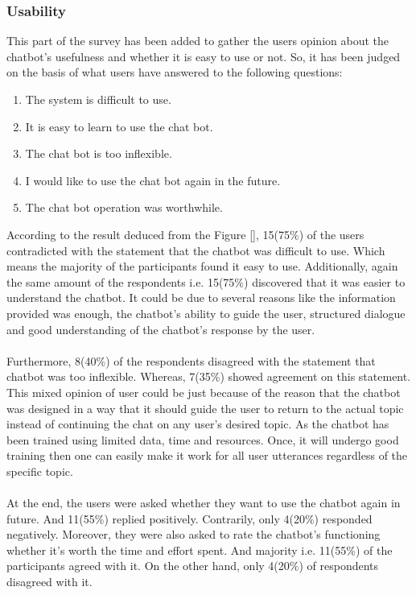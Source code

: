 \subsubsection*{Usability}
This part of the survey has been added to gather the users opinion about the chatbot's usefulness and whether it is easy to use or not. So, it has been judged on the basis of what users have answered to the following questions:
\begin{enumerate}
    \item The system is difficult to use.
    \item It is easy to learn to use the chat bot.
    \item The chat bot is too inflexible.
    \item I would like to use the chat bot again in the future.
    \item The chat bot operation was worthwhile.
\end{enumerate}
According to the result deduced from the Figure \ref{}, 15(75\%) of the users contradicted with the statement that the chatbot was difficult to use. Which means the majority of the participants found it easy to use. Additionally, again the same amount of the respondents i.e. 15(75\%) discovered that it was easier to understand the chatbot. It could be due to several reasons like the information provided was enough, the chatbot's ability to guide the user, structured dialogue and good understanding of the chatbot's response by the user.
\\~\\
Furthermore, 8(40\%) of the respondents disagreed with the statement that chatbot was too inflexible. Whereas, 7(35\%) showed agreement on this statement. This mixed opinion of user could be just because of the reason that the chatbot was designed in a way that it should guide the user to return to the actual topic instead of continuing the chat on any user's desired topic. As the chatbot has been trained using limited data, time and resources. Once, it will undergo good training then one can easily make it work for all user utterances regardless of the specific topic.
\\~\\
At the end, the users were asked whether they want to use the chatbot again in future. And 11(55\%) replied positively. Contrarily, only 4(20\%) responded negatively. Moreover, they were also asked to rate the chatbot's functioning whether it's worth the time and effort spent. And majority i.e. 11(55\%) of the participants agreed with it. On the other hand, only 4(20\%) of respondents disagreed with it.

